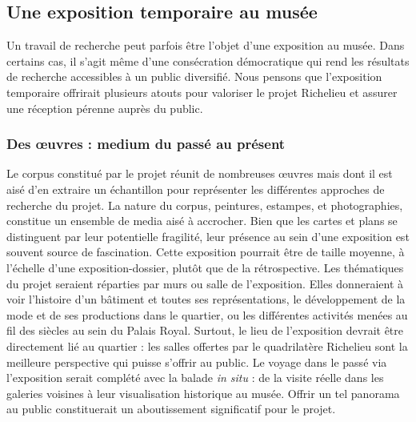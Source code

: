 \subsection{Une exposition temporaire au musée}
Un travail de recherche peut parfois être l'objet d'une exposition au musée. Dans certains cas, il s'agit même d'une consécration démocratique qui rend les résultats de recherche accessibles à un public diversifié. Nous pensons que l'exposition temporaire offrirait plusieurs atouts pour valoriser le projet Richelieu et assurer une réception pérenne auprès du public. 

\subsubsection{Des œuvres : medium du passé au présent}
Le corpus constitué par le projet réunit de nombreuses œuvres mais dont il est aisé d'en extraire un échantillon pour représenter les différentes approches de recherche du projet. La nature du corpus, peintures, estampes, et photographies, constitue un ensemble de media aisé à accrocher. Bien que les cartes et plans se distinguent par leur potentielle fragilité, leur présence au sein d'une exposition est souvent source de fascination. Cette exposition pourrait être de taille moyenne, à l'échelle d'une exposition-dossier, plutôt que de la rétrospective. Les thématiques du projet seraient réparties par murs ou salle de l'exposition. Elles donneraient à voir l'histoire d'un bâtiment et toutes ses représentations, le développement de la mode et de ses productions dans le quartier, ou les différentes activités menées au fil des siècles au sein du Palais Royal. Surtout, le lieu de l'exposition devrait être directement lié au quartier : les salles offertes par le quadrilatère Richelieu sont la meilleure perspective qui puisse s'offrir au public. Le voyage dans le passé via l'exposition serait complété avec la balade \textit{in situ} : de la visite réelle dans les galeries voisines à leur visualisation historique au musée. Offrir un tel panorama au public constituerait un aboutissement significatif pour le projet.

